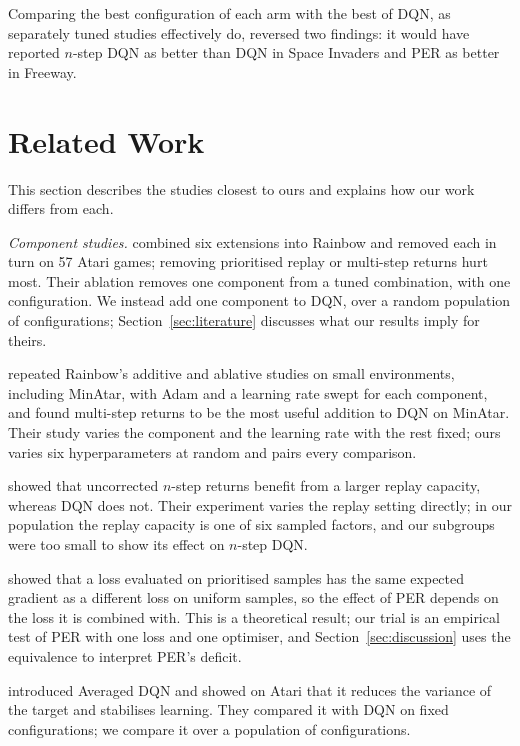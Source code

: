 \documentclass[conference,a4paper]{IEEEtran}
\begin{document}
Comparing the best configuration of each arm with the best of DQN, as separately tuned studies effectively do, reversed
two findings: it would have reported $n$-step DQN as better than DQN in Space Invaders and PER as better in Freeway.

\section{Related Work}\label{sec:related}

This section describes the studies closest to ours and explains how our work differs from each.

\emph{Component studies.} \citet{hessel2018rainbow} combined six extensions into Rainbow and removed each in turn on 57
Atari games; removing prioritised replay or multi-step returns hurt most. Their ablation removes one component from a
tuned combination, with one configuration. We instead add one component to DQN, over a random population of
configurations; Section~\ref{sec:literature} discusses what our results imply for theirs.

\citet{obandoceron2021revisiting} repeated Rainbow's additive and ablative studies on small environments, including
MinAtar, with Adam and a learning rate swept for each component, and found multi-step returns to be the most useful
addition to DQN on MinAtar. Their study varies the component and the learning rate with the rest fixed; ours varies six
hyperparameters at random and pairs every comparison.

\citet{fedus2020revisiting} showed that uncorrected $n$-step returns benefit from a larger replay capacity, whereas DQN
does not. Their experiment varies the replay setting directly; in our population the replay capacity is one of six
sampled factors, and our subgroups were too small to show its effect on $n$-step DQN.

\citet{fujimoto2020equivalence} showed that a loss evaluated on prioritised samples has the same expected gradient as a
different loss on uniform samples, so the effect of PER depends on the loss it is combined with. This is a theoretical
result; our trial is an empirical test of PER with one loss and one optimiser, and Section~\ref{sec:discussion} uses
the equivalence to interpret PER's deficit.

\citet{anschel2017averaged} introduced Averaged DQN and showed on Atari that it reduces the variance of the target and
stabilises learning. They compared it with DQN on fixed configurations; we compare it over a population of
configurations.
\end{document}
